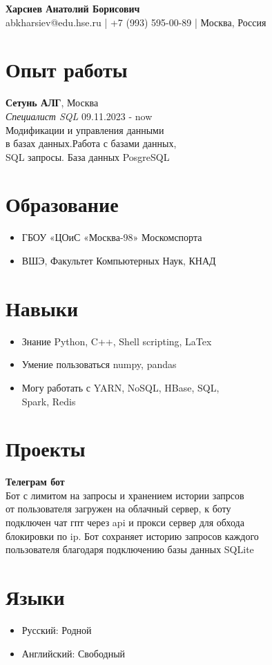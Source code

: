 \documentclass[a4paper,12pt]{article}
\begin{document}
\begin{center}
    \Huge\textbf{{Харсиев Анатолий Борисович}}\\
    \normalsize{abkharsiev@edu.hse.ru | +7 (993) 595-00-89 | Москва, Россия}
\end{center}

\section*{Опыт работы}
\large{
\textbf{Сетунь АЛГ}, Москва \\
\emph{Специалист SQL} \hfill 09.11.2023 - now \\
Модификации и управления данными\\
в базах данных.Работа с базами данных,\\
SQL запросы. База данных PosgreSQL}



\section*{Образование}
\begin{itemize}
    \item ГБОУ «ЦОиС «Москва-98» Москомспорта
    \item ВШЭ, Факультет Компьютерных Наук, КНАД
\end{itemize}
 

\section*{Навыки}
\begin{itemize}
    \item Знание Python, C++, Shell scripting, LaTex
    \item Умение пользоваться numpy, pandas
    \item Могу работать с YARN, NoSQL, HBase, SQL,\\
    Spark, Redis
\end{itemize}

\section*{Проекты}
\textbf{Телеграм бот} \\
\large{Бот с лимитом на запросы и хранением истории запрсов\\
от пользователя загружен на облачный сервер, к боту\\
подключен чат гпт через api и прокси сервер для обхода \\
блокировки по ip. Бот сохраняет историю запросов каждого\\
пользователя благодаря подключению базы данных SQLite}

\section*{Языки}
\begin{itemize}
    \item Русский: Родной
    \item Английский: Свободный 
\end{itemize}
\end{document}
